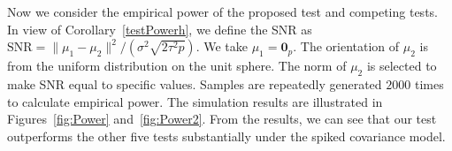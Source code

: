 \documentclass[times,sort&compress,3p]{elsarticle}
\theoremstyle{plain}
\theoremstyle{definition}
\theoremstyle{remark}
\begin{document}
Now we consider the empirical power of the proposed test and competing tests.
In view of Corollary~\ref{testPowerh}, we define the SNR as $\textrm{SNR}=\|\mu_1-\mu_2\|^2/(\sigma^2\sqrt{2\tau^2 p})$.
We take $\mu_1=\mathbf{0}_p$.
The orientation of $\mu_2$ is from the uniform distribution on the unit sphere.
The norm of $\mu_2$ is selected to make SNR equal to specific values.
Samples are repeatedly generated $2000$ times to calculate empirical power.
The simulation results are illustrated in Figures~\ref{fig:Power} and~\ref{fig:Power2}.
From the results, we can see that our test outperforms the other five tests substantially under the spiked covariance model.

\begin{figure}
    \centering 
    \\
\end{figure}
\end{document}

